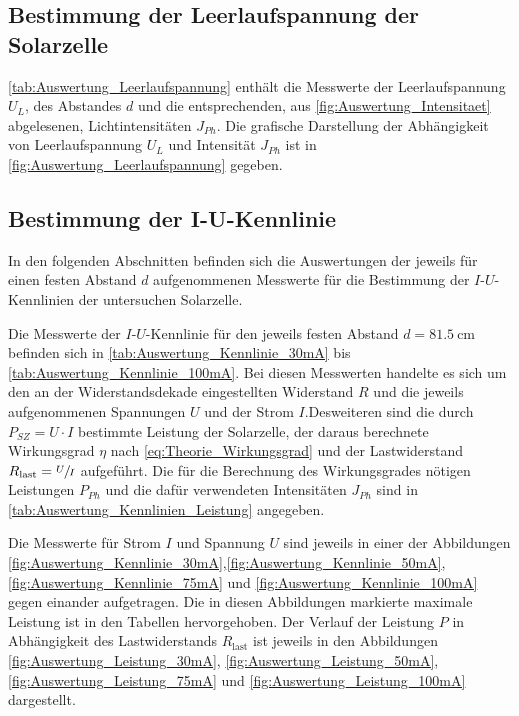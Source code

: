 	
\subsection{Bestimmung der Leerlaufspannung der Solarzelle}
	
	\cref{tab:Auswertung_Leerlaufspannung} enthält die Messwerte der Leerlaufspannung $ U_{L} $,
	des Abstandes $ d $ und die entsprechenden, aus \cref{fig:Auswertung_Intensitaet} abgelesenen,
	Lichtintensitäten $ J_{Ph} $. Die grafische Darstellung der Abhängigkeit von Leerlaufspannung $ U_{L} $
	und Intensität $ J_{Ph} $ ist in \cref{fig:Auswertung_Leerlaufspannung} gegeben.


	
	
	
\subsection{Bestimmung der I-U-Kennlinie}
	In den folgenden Abschnitten befinden sich die Auswertungen der jeweils für
	einen festen Abstand $d$ aufgenommenen Messwerte für die Bestimmung der $I \text{-}U$-Kennlinien
	der untersuchen Solarzelle.  
	
	Die Messwerte der $I\text{-}U$-Kennlinie für den jeweils festen Abstand $d = \SI{81.5}{\cm}$
	befinden sich in \cref{tab:Auswertung_Kennlinie_30mA} bis \ref{tab:Auswertung_Kennlinie_100mA}.
    Bei diesen Messwerten handelte es
	sich um den an der Widerstandsdekade eingestellten Widerstand $R$ und die jeweils aufgenommenen 
	Spannungen $U$ und der Strom $I$.Desweiteren sind die durch $P_{SZ} = U \cdot I$ bestimmte
	Leistung der Solarzelle, der daraus berechnete Wirkungsgrad $\eta$ nach \cref{eq:Theorie_Wirkungsgrad} 
	und der Lastwiderstand $R_{\text{last}} = \sfrac{U}{I}$ aufgeführt.
	Die für die Berechnung des Wirkungsgrades nötigen Leistungen $P_{Ph}$ und die dafür verwendeten 
	Intensitäten $J_{Ph}$ sind in \cref{tab:Auswertung_Kennlinien_Leistung} angegeben.   
	
	Die Messwerte für Strom $I$ und Spannung $U$ sind jeweils in einer der Abbildungen 
	\ref{fig:Auswertung_Kennlinie_30mA},\ref{fig:Auswertung_Kennlinie_50mA},
	\ref{fig:Auswertung_Kennlinie_75mA} und \ref{fig:Auswertung_Kennlinie_100mA} gegen einander aufgetragen.
	Die in diesen Abbildungen markierte maximale Leistung ist in den Tabellen hervorgehoben.
	Der Verlauf der Leistung $P$ in Abhängigkeit des Lastwiderstands $R_{\text{last}}$ ist 
	jeweils in den Abbildungen \ref{fig:Auswertung_Leistung_30mA}, \ref{fig:Auswertung_Leistung_50mA},
	 \ref{fig:Auswertung_Leistung_75mA} und \ref{fig:Auswertung_Leistung_100mA} dargestellt.



